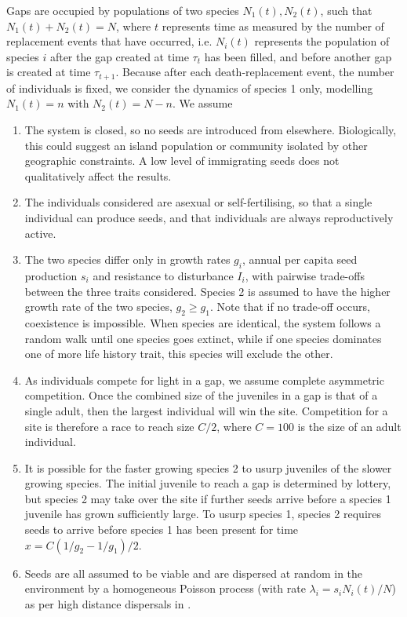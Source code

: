 \documentclass[a4paper]{article}
\begin{document}
Gaps are occupied by populations of two species $N_1(t), N_2(t)$, such that $N_1(t) + N_2(t) = N$, where $t$ represents time as measured by the number of replacement events that have occurred, i.e. $N_i(t)$ represents the population of species $i$ after the gap created at time $\tau_t$ has been filled, and before another gap is created at time $\tau_{t+1}$. Because after each death-replacement event, the number of individuals is fixed, we consider the dynamics of species 1 only, modelling $N_1(t)=n$ with $N_2(t)=N-n$. We assume 
\begin{enumerate}
\item The system is closed, so no seeds are introduced from elsewhere. Biologically, this could suggest an island population or community isolated by other geographic constraints. A low level of immigrating seeds does not qualitatively affect the results.
\item The individuals considered are asexual or self-fertilising, so that a single individual can produce seeds, and that individuals are always reproductively active.
\item The two species differ only in growth rates $g_i$, annual per capita seed production $s_i$ and resistance to disturbance $I_i$, with pairwise trade-offs between the three traits considered. Species 2 is assumed to have the higher growth rate of the two species, $g_2\geq g_1$. Note that if no trade-off occurs, coexistence is impossible. When species are identical, the system follows a random walk until one species goes extinct, while if one species dominates one of more life history trait, this species will exclude the other.
\item As individuals compete for light in a gap, we assume complete asymmetric competition. Once the combined size of the juveniles in a gap is that of a single adult, then the largest individual will win the site. Competition for a site is therefore a race to reach size $C/2$, where $C=100$ is the size of an adult individual.
\item It is possible for the faster growing species 2 to usurp juveniles of the slower growing species. The initial juvenile to reach a gap is determined by lottery, but species 2 may take over the site if further seeds arrive before a species 1 juvenile has grown sufficiently large. To usurp species 1, species 2 requires seeds to arrive before species 1 has been present for time $x=C(1/g_2-1/g_1)/2$.
\item Seeds are all assumed to be viable and are dispersed at random in the environment by a homogeneous Poisson process (with rate $\lambda_i =s_iN_i(t)/N$) as per high distance dispersals in \cite{clark1999interpreting}.

\end{enumerate}
\end{document}

